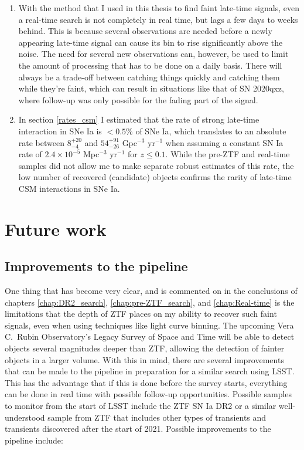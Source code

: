 \documentclass[a4paper,oneside,12pt, class=Latex/Classes/PhDthesisPSnPDF, crop=false]{standalone}
\begin{document}
\begin{enumerate}
	\item With the method that I used in this thesis to find faint late-time signals, even a real-time search is not completely in real time, but lags a few days to weeks behind. This is because several observations are needed before a newly appearing late-time signal can cause its bin to rise significantly above the noise. The need for several new observations can, however, be used to limit the amount of processing that has to be done on a daily basis. There will always be a trade-off between catching things quickly and catching them while they're faint, which can result in situations like that of SN 2020qxz, where follow-up was only possible for the fading part of the signal.
	\item In section \ref{rates_csm} I estimated that the rate of strong late-time interaction in SNe Ia is $<0.5$\% of SNe Ia, which translates to an absolute rate between $8_{-4}^{+20}$ and $54_{-26}^{+91}$ Gpc$^{-3}$ yr$^{-1}$ when assuming a constant SN Ia rate of $2.4\times10^{-5}$ Mpc$^{-3}$ yr$^{-1}$ for $z \leq 0.1$. While the pre-ZTF and real-time samples did not allow me to make separate robust estimates of this rate, the low number of recovered (candidate) objects confirms the rarity of late-time CSM interactions in SNe Ia.
\end{enumerate}


\section{Future work}
\subsection{Improvements to the pipeline}
One thing that has become very clear, and is commented on in the conclusions of chapters \ref{chap:DR2_search}, \ref{chap:pre-ZTF_search}, and \ref{chap:Real-time} is the limitations that the depth of ZTF places on my ability to recover such faint signals, even when using techniques like light curve binning. The upcoming Vera C.~Rubin Observatory's Legacy Survey of Space and Time \cite[LSST;][]{LSST} will be able to detect objects several magnitudes deeper than ZTF, allowing the detection of fainter objects in a larger volume. With this in mind, there are several improvements that can be made to the pipeline in preparation for a similar search using LSST. This has the advantage that if this is done before the survey starts, everything can be done in real time with possible follow-up opportunities. Possible samples to monitor from the start of LSST include the ZTF SN Ia DR2 or a similar well-understood sample from ZTF that includes other types of transients and transients discovered after the start of 2021. Possible improvements to the pipeline include:
\end{document}
